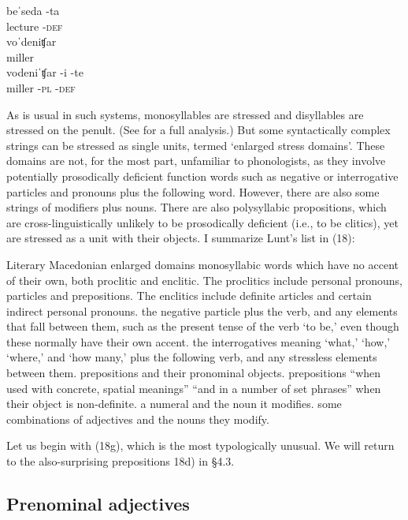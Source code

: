\documentclass[output=paper,
modfonts
]{LSP/langsci}
\begin{document}
	\ex \gll beˈseda \squish-ta\\
	lecture \squish-\textsc{def}\\
	
	\ex \gll voˈdeniʧar\\
	miller\\
	
	\ex \gll vodeniˈʧar \squish-i \squish-te\\
	miller \squish-\textsc{pl} \squish\textsc{-def}\\
	\z
\z

\noindent As is usual in such systems, monosyllables are stressed and disyllables are stressed on the penult. (See \citealt[53]{halle1987} for a full analysis.) But some syntactically complex strings can be stressed as single units, termed ‘enlarged stress domains’. These domains are not, for the most part, unfamiliar to phonologists, as they involve potentially prosodically deficient function words such as negative or interrogative particles and pronouns plus the following word. However, there are also some\textit{} strings of modifiers plus nouns. There are also polysyllabic propositions, which are cross-linguistically unlikely to be prosodically deficient (i.e., to be clitics), yet are stressed as a unit with their objects. I summarize Lunt’s list in (18):

\ea Literary Macedonian enlarged domains \citep[23--25]{lunt1952}
	\ea monosyllabic words which have no accent of their own, both proclitic and enclitic. The proclitics include personal pronouns, particles and prepositions. The enclitics include definite articles and certain indirect personal pronouns.
	\ex the negative particle plus the verb, and any elements that fall between them, such as the present tense of the verb ‘to be,’ even though these normally have their own accent. 
	\ex the interrogatives meaning `what,' `how,' `where,' and `how many,' plus the following verb, and any stressless elements between them.
	\ex prepositions and their pronominal objects.
	\ex prepositions “when used with concrete, spatial meanings” “and in a number of set phrases” when their object is non-definite.
	\ex a numeral and the noun it modifies.
	\ex some combinations of adjectives and the nouns they modify.
	\z
\z

\noindent Let us begin with (18g), which is the most typologically unusual. We will return to the also-surprising prepositions 18d) in §4.3. 

\subsection[Prenominal adjectives ]{Prenominal adjectives} 
\end{document}
